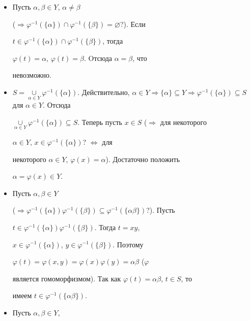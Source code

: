 \begin{itemize} 


\item[$\alpha)$] Пусть $\alpha,\beta\in Y$, $\alpha\ne\beta$ 


($\Rightarrow\varphi^{-1}(\{\alpha\})\cap\varphi^{-1} 


(\{\beta\})=\varnothing$?). Если 


$t\in\varphi^{-1}(\{\alpha\})\cap\varphi^{-1}(\{\beta\})$, тогда


$\varphi(t)=\alpha$, $\varphi(t)=\beta$. Oтсюда $\alpha=\beta$, что 


невозможно. 


\item[$\beta)$] $S=\mathop{\cup}\limits_{\alpha\in Y} 


\varphi^{-1}(\{\alpha\})$. Действительно, $\alpha\in Y\Rightarrow 


\{\alpha\}\subseteq Y\Rightarrow\varphi^{-1}(\{\alpha\}) 


\subseteq S$ для $\alpha\in Y$. Отсюда 


$\mathop{\cup}\limits_{\alpha\in Y}\varphi^{-1}(\{\alpha\}) 


\subseteq S$. Теперь пусть $x\in S$ ($\Rightarrow$ для некоторого 


$\alpha\in Y$, $x\in\varphi^{-1}(\{\alpha\})$? $\Leftrightarrow$ для 


некоторого $\alpha\in Y$, $\varphi(x)=\alpha$). Достаточно положить 


$\alpha=\varphi(x)\in Y$. 


\item[$\gamma)$] Пусть $\alpha,\beta\in Y$ 


($\Rightarrow\varphi^{-1}(\{\alpha\})\varphi^{-1}(\{\beta\}) 


\subseteq\varphi^{-1}(\{\alpha\beta\})$?). Пусть 


$t\in\varphi^{-1}(\{\alpha\})\varphi^{-1}(\{\beta\})$. Тогда $t=xy$, 


$x\in\varphi^{-1}(\{\alpha\})$, $y\in\varphi^{-1}(\{\beta\})$. Поэтому 


$\varphi(t)=\varphi(x,y)=\varphi(x)\varphi(y)=\alpha\beta$ ($\varphi$ 


является гомоморфизмом). Так как $\varphi(t)=\alpha\beta$, $t\in S$, то 


имеем $t\in\varphi^{-1}(\{\alpha\beta\})$. 


\item[$\delta)$] Пусть $\alpha,\beta\in Y$, 



\end{itemize}
